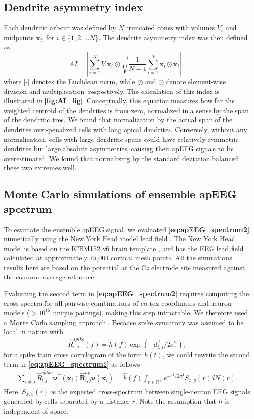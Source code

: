 \subsection{Dendrite asymmetry index}
Each dendritic arbour was defined by $N$ truncated cones with volumes $V_i$ and midpoints $\bm{x}_i$, for $i\in\{1,2,...N\}$. The dendrite asymmetry index was then defined as
\begin{equation} \label{eq:AI}
    AI = \left | \sum_{i=1}^N V_i \bm{x}_i \oslash \sqrt{\frac{1}{N-1} \sum_{i=1}^N \bm{x}_i \odot \bm{x}_i} \right |,
\end{equation}
where $\left | \cdot \right |$ denotes the Euclidean norm, while $\oslash$ and $\odot$ denote element-wise division and multiplication, respectively. The calculation of this index is illustrated in \textbf{\autoref{fig:AI_fig}}. Conceptually, this equation measures how far the weighted centroid of the dendrites is from zero, normalized in a sense by the span of the dendritic tree. We found that normalization by the actual span of the dendrites over-penalized cells with long apical dendrites. Conversely, without any normalization, cells with large dendritic spans could have relatively symmetric dendrites but large absolute asymmetries, causing their apEEG signals to be overestimated. We found that normalizing by the standard deviation balanced these two extremes well.

\subsection{Monte Carlo simulations of ensemble apEEG spectrum}
To estimate the ensemble apEEG signal, we evaluated \textbf{\ref{eq:apEEG_spectrum2}} numerically using the New York Head model lead field \cite{Huang2016}. The New York Head model is based on the ICBM152 v6 brain template \cite{Fonov2009,Fonov2011}, and has the EEG lead field calculated at approximately 75,000 cortical mesh points. All the simulations results here are based on the potential at the Cz electrode site measured against the common average reference.

Evaluating the second term in \textbf{\ref{eq:apEEG_spectrum2}} requires computing the cross spectra for all pairwise combinations of cortex coordinates and neuron models ($>10^{15}$ unique pairings), making this step intractable. We therefore used a Monte Carlo sampling approach \cite{Robert2004}. Because spike synchrony was assumed to be local in nature with
\begin{equation*}
    \hat{R}^{spike}_{i,j}(f) = \hat{h}(f) \exp(-d_{i,j}^2/2\sigma_r^2),
\end{equation*}
for a spike train cross correlogram of the form $h(t)$, we could rewrite the second term in \textbf{\ref{eq:apEEG_spectrum2}} as follows
\begin{align*}
    \sum_{i\ne j} \hat{R}^{spike}_{i,j} \bm{\nu}^\intercal(\bm{x}_i) \hat{\bm{R}}^{ap}_{i,j}\bm{\nu}(\bm{x}_j) = \hat{h}(f) \int_{r\in\mathbb{R}^+}  e^{-r^2/2\sigma_r^2} \bar{S}_{x,y}(r) dN(r).
\end{align*}
Here, $\bar{S}_{x,y}(r)$ is the expected cross-spectrum between single-neuron EEG signals generated by cells separated by a distance $r$. Note the assumption that $h$ is independent of space.

